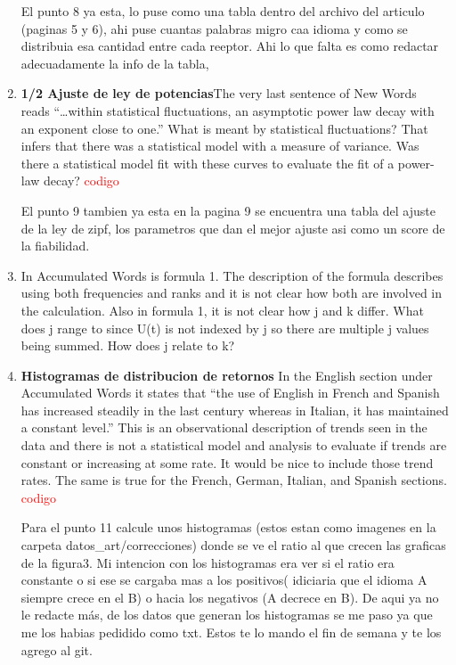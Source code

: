 \documentclass{article}
\begin{document}
\begin{enumerate}
El punto 8 ya esta, lo puse como una tabla dentro del archivo del articulo (paginas 5 y 6), ahi puse cuantas palabras migro caa idioma y como se distribuia esa cantidad entre cada reeptor. Ahi lo que falta es como redactar adecuadamente la info de la tabla,

\item \textbf{1/2 Ajuste de ley de potencias}The very last sentence of New Words reads “…within statistical %
fluctuations, an asymptotic power law decay with an exponent close to
one.” What is meant by statistical fluctuations? That infers that
there was a statistical model with a measure of variance. Was there a
statistical model fit with these curves to evaluate the fit of a
power-law decay? \textcolor{red}{codigo}

El punto 9 tambien ya esta en la pagina 9 se encuentra una tabla del ajuste de la ley de zipf, los parametros que dan el mejor ajuste asi como un score de la fiabilidad.



\item  In Accumulated Words is formula 1. The description of the formula 
describes using both frequencies and ranks and it is not clear how
both are involved in the calculation. Also in formula 1, it is not
clear how j and k differ. What does j range to since U(t) is not
indexed by j so there are multiple j values being summed. How does j
relate to k?


\item \textbf{Histogramas de distribucion de retornos }In the English section under Accumulated Words it states that “the 
use of English in French and Spanish has increased steadily in the
last century whereas in Italian, it has maintained a constant level.”
This is an observational description of trends seen in the data and
there is not a statistical model and analysis to evaluate if trends
are constant or increasing at some rate. It would be nice to include
those trend rates. The same is true for the French, German, Italian,
and Spanish sections. \textcolor{red}{codigo}


Para el punto 11 calcule unos histogramas (estos estan como imagenes en la
carpeta datos\_art/correcciones) donde se ve el ratio al que crecen las graficas
de la figura3. Mi intencion con los histogramas era ver si el ratio era
constante o si ese se cargaba mas a los positivos( idiciaria que el idioma A
siempre crece en el B) o hacia los negativos (A decrece en B). De aqui ya no le
redacte más, de los datos que generan los histogramas se me paso ya que me los
habias pedidido como txt. Estos te lo mando el fin de semana y te los agrego al
git.


\end{enumerate}
\end{document}
